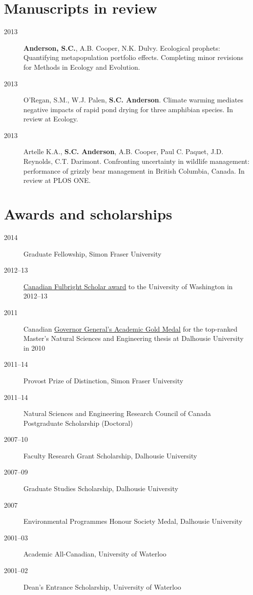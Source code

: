 \section{Manuscripts in review}

\begin{description}
\item[2013]
\textbf{Anderson, S.C.}, A.B. Cooper, N.K. Dulvy. Ecological prophets:
Quantifying metapopulation portfolio effects. Completing minor revisions
for Methods in Ecology and Evolution.
\item[2013]
O'Regan, S.M., W.J. Palen, \textbf{S.C. Anderson}. Climate warming
mediates negative impacts of rapid pond drying for three amphibian
species. In review at Ecology.
\item[2013]
Artelle K.A., \textbf{S.C. Anderson}, A.B. Cooper, Paul C. Paquet, J.D.
Reynolds, C.T. Darimont. Confronting uncertainty in wildlife management:
performance of grizzly bear management in British Columbia, Canada. In
review at PLOS ONE.
\end{description}

\section{Awards and scholarships}

\begin{description}
\item[2014]
Graduate Fellowship, Simon Fraser University
\item[2012--13]
\href{http://www.fulbright.ca/programs/canadian-students/2012-2013-canadian-fulbright-students.html}{Canadian
Fulbright Scholar award} to the University of Washington in 2012--13
\item[2011]
Canadian \href{http://goo.gl/nA1zE}{Governor General's Academic Gold
Medal} for the top-ranked Master's Natural Sciences and Engineering
thesis at Dalhousie University in 2010
\item[2011--14]
Provost Prize of Distinction, Simon Fraser University
\item[2011--14]
Natural Sciences and Engineering Research Council of Canada Postgraduate
Scholarship (Doctoral)
\item[2007--10]
Faculty Research Grant Scholarship, Dalhousie University
\item[2007--09]
Graduate Studies Scholarship, Dalhousie University
\item[2007]
Environmental Programmes Honour Society Medal, Dalhousie University
\item[2001--03]
Academic All-Canadian, University of Waterloo
\item[2001--02]
Dean's Entrance Scholarship, University of Waterloo
\end{description}

